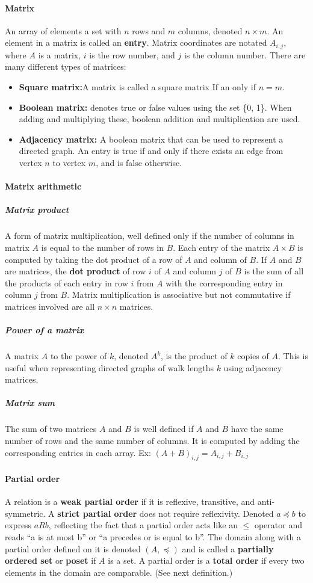 \documentclass[a4paper]{article}
\begin{document}
\paragraph{Matrix} An array of elements a set with $n$ rows and $m$ columns, denoted $n \times m$. An element in a matrix is called an \textbf{entry}. Matrix coordinates are notated $A_{i, j}$, where $A$ is a matrix, $i$ is the row number, and $j$ is the column number. There are many different types of matrices:
\begin{itemize}
  \item \textbf{Square matrix:}A matrix is called a square matrix If an only if $n = m$.
  \item \textbf{Boolean matrix:} denotes true or false values using the set \{0, 1\}. When adding and multiplying these, boolean addition and multiplication are used.
  \item \textbf{Adjacency matrix:} A boolean matrix that can be used to represent a directed graph. An entry is true if and only if there exists an edge from vertex $n$ to vertex $m$, and is false otherwise.
\end{itemize}
\paragraph{Matrix arithmetic}
\subparagraph{Matrix product} A form of matrix multiplication, well defined only if the number of columns in matrix $A$ is equal to the number of rows in $B$. Each entry of the matrix $A \times B$ is computed by taking the dot product of a row of $A$ and  column of $B$. If $A$ and $B$ are matrices, the \textbf{dot product} of row $i$ of $A$ and column $j$ of $B$ is the sum of all the products of each entry in row $i$ from $A$ with the corresponding entry in column $j$ from $B$. Matrix multiplication is associative but not commutative if matrices involved are all $n \times n$ matrices.
\subparagraph{Power of a matrix} A matrix $A$ to the power of $k$, denoted $A^k$, is the product of $k$ copies of $A$. This is useful when representing directed graphs of walk lengths $k$ using adjacency matrices.
\subparagraph{Matrix sum} The sum of two matrices $A$ and $B$ is well defined if $A$ and $B$ have the same number of rows and the same number of columns. It is computed by adding the corresponding entries in each array. Ex: $(A + B)_{i, j} = A_{i, j} + B_{i, j}$
\paragraph{Partial order} A relation is a \textbf{weak partial order} if it is reflexive, transitive, and anti-symmetric. A \textbf{strict partial order} does not require reflexivity. Denoted $a \preceq b$ to express $aRb$, reflecting the fact that a partial order acts like an $\leq$ operator and reads ``a is at most b'' or ``a precedes or is equal to b''. The domain along with a partial order defined on it is denoted $(A, \preceq)$ and is called a \textbf{partially ordered set} or \textbf{poset} if $A$ is a set. A partial order is a \textbf{total order} if every two elements in the domain are comparable. (See next definition.)
\end{document}
